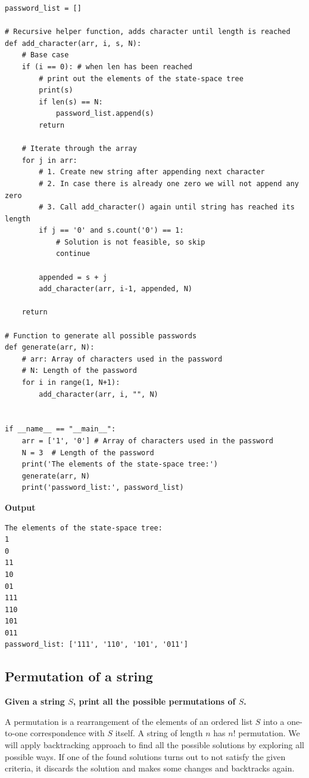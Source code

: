 \documentclass[a4paper,11pt]{book}
\begin{document}
\begin{lstlisting}
password_list = []

# Recursive helper function, adds character until length is reached
def add_character(arr, i, s, N):
    # Base case
    if (i == 0): # when len has been reached
        # print out the elements of the state-space tree
        print(s)
        if len(s) == N:
            password_list.append(s)
        return
     
    # Iterate through the array
    for j in arr:
        # 1. Create new string after appending next character 
        # 2. In case there is already one zero we will not append any zero
        # 3. Call add_character() again until string has reached its length
        if j == '0' and s.count('0') == 1:
            # Solution is not feasible, so skip
            continue
        
        appended = s + j
        add_character(arr, i-1, appended, N)
 
    return
 
# Function to generate all possible passwords
def generate(arr, N):
    # arr: Array of characters used in the password
    # N: Length of the password
    for i in range(1, N+1):
        add_character(arr, i, "", N)

     
if __name__ == "__main__":
    arr = ['1', '0'] # Array of characters used in the password
    N = 3  # Length of the password
    print('The elements of the state-space tree:')
    generate(arr, N)
    print('password_list:', password_list)
\end{lstlisting}
\textbf{Output}
\begin{lstlisting}
The elements of the state-space tree:
1
0
11
10
01
111
110
101
011
password_list: ['111', '110', '101', '011']
\end{lstlisting}

\subsection{Permutation of a string}

\textbf{Given a string $S$, print all the possible permutations of $S$.}
\vspace{5mm}

\noindent A permutation is a rearrangement of the elements of an ordered list $S$ into a one-to-one correspondence with $S$ itself. A string of length $n$ has $n!$ permutation. We will apply backtracking approach to find all the possible solutions by exploring all possible ways. If one of the found solutions turns out to not satisfy the given criteria, it discards the solution and makes some changes and backtracks again.
\end{document}
